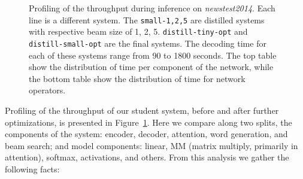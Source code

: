 \documentclass[11pt,a4paper]{article}
\begin{document}
\begin{figure}
\centering
{}
\caption{\small Profiling of the throughput during inference on {\it newstest2014}. Each line is a different system. The {\tt small-1,2,5} are distilled systems with respective beam size of 1, 2, 5. {\tt distill-tiny-opt} and {\tt distill-small-opt} are the final systems. The decoding time for each of these systems range from 90 to 1800 seconds. The top table show the distribution of time per component of the network, while the bottom table show the distribution of time for network operators.}
\label{fig:decoding_cost}
\end{figure}


Profiling of the throughput of our student system, before
and after further optimizations, is presented in Figure~\ref{fig:decoding_cost}. Here we compare along two splits,
the components of the system: encoder, decoder, attention, word generation, and beam search; and model components: linear, MM (matrix multiply, primarily in attention), softmax, activations, and others.
From this analysis we gather the following facts:
\end{document}
